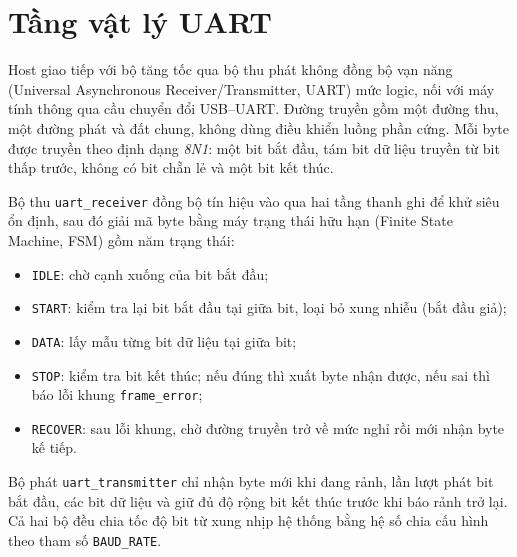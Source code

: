 \section{Tầng vật lý UART}\label{sec:uartvl}
Host giao tiếp với bộ tăng tốc qua bộ thu phát không đồng bộ vạn năng (Universal Asynchronous Receiver/Transmitter, UART) mức logic, nối với máy tính thông qua cầu chuyển đổi USB--UART.
Đường truyền gồm một đường thu, một đường phát và đất chung, không dùng điều khiển luồng phần cứng.
Mỗi byte được truyền theo định dạng \emph{8N1}: một bit bắt đầu, tám bit dữ liệu truyền từ bit thấp trước, không có bit chẵn lẻ và một bit kết thúc.

Bộ thu \texttt{uart\_receiver} đồng bộ tín hiệu vào qua hai tầng thanh ghi để khử siêu ổn định, sau đó giải mã byte bằng máy trạng thái hữu hạn (Finite State Machine, FSM) gồm năm trạng thái:
\begin{itemize}
  \item \texttt{IDLE}: chờ cạnh xuống của bit bắt đầu;
  \item \texttt{START}: kiểm tra lại bit bắt đầu tại giữa bit, loại bỏ xung nhiễu (bắt đầu giả);
  \item \texttt{DATA}: lấy mẫu từng bit dữ liệu tại giữa bit;
  \item \texttt{STOP}: kiểm tra bit kết thúc; nếu đúng thì xuất byte nhận được, nếu sai thì báo lỗi khung \texttt{frame\_error};
  \item \texttt{RECOVER}: sau lỗi khung, chờ đường truyền trở về mức nghỉ rồi mới nhận byte kế tiếp.
\end{itemize}
Bộ phát \texttt{uart\_transmitter} chỉ nhận byte mới khi đang rảnh, lần lượt phát bit bắt đầu, các bit dữ liệu và giữ đủ độ rộng bit kết thúc trước khi báo rảnh trở lại.
Cả hai bộ đều chia tốc độ bit từ xung nhịp hệ thống bằng hệ số chia cấu hình theo tham số \texttt{BAUD\_RATE}.
